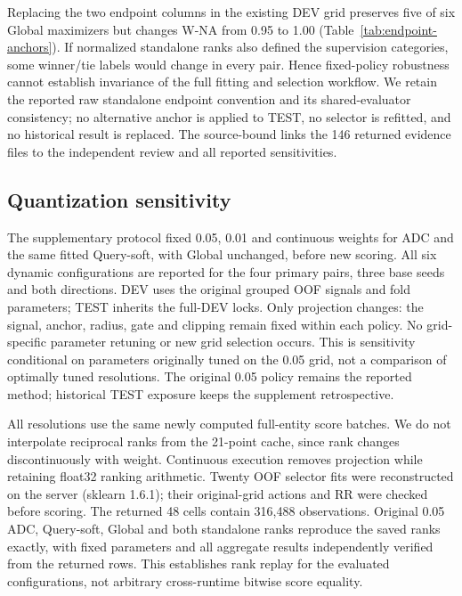\documentclass[11pt,a4paper]{article}
\begin{document}


Replacing the two endpoint columns in the existing DEV grid preserves five of six Global maximizers but changes W-NA from 0.95 to 1.00 (Table~\ref{tab:endpoint-anchors}). If normalized standalone ranks also defined the supervision categories, some winner/tie labels would change in every pair. Hence fixed-policy robustness cannot establish invariance of the full fitting and selection workflow. We retain the reported raw standalone endpoint convention and its shared-evaluator consistency; no alternative anchor is applied to TEST, no selector is refitted, and no historical result is replaced. The source-bound  links the 146 returned evidence files to the independent review and all reported sensitivities.

\FloatBarrier

\subsection{Quantization sensitivity}
\label{app:grid-sensitivity}
The supplementary protocol fixed 0.05, 0.01 and continuous weights for ADC and the same fitted Query-soft, with Global unchanged, before new scoring. All six dynamic configurations are reported for the four primary pairs, three base seeds and both directions. DEV uses the original grouped OOF signals and fold parameters; TEST inherits the full-DEV locks. Only projection changes: the signal, anchor, radius, gate and clipping remain fixed within each policy. No grid-specific parameter retuning or new grid selection occurs. This is sensitivity conditional on parameters originally tuned on the 0.05 grid, not a comparison of optimally tuned resolutions. The original 0.05 policy remains the reported method; historical TEST exposure keeps the supplement retrospective.

All resolutions use the same newly computed full-entity score batches. We do not interpolate reciprocal ranks from the 21-point cache, since rank changes discontinuously with weight. Continuous execution removes projection while retaining float32 ranking arithmetic. Twenty OOF selector fits were reconstructed on the server (sklearn 1.6.1); their original-grid actions and RR were checked before scoring. The returned 48 cells contain 316,488 observations. Original 0.05 ADC, Query-soft, Global and both standalone ranks reproduce the saved ranks exactly, with fixed parameters and all aggregate results independently verified from the returned rows. This establishes rank replay for the evaluated configurations, not arbitrary cross-runtime bitwise score equality.
\end{document}
